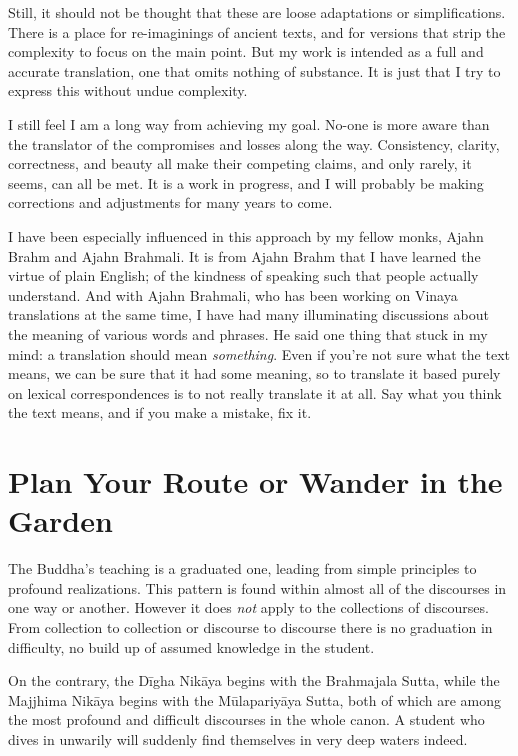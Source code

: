 \documentclass[12pt,openany]{book}%
\begin{document}
Still, it should not be thought that these are loose adaptations or simplifications. There is a place for re-imaginings of ancient texts, and for versions that strip the complexity to focus on the main point. But my work is intended as a full and accurate translation, one that omits nothing of substance. It is just that I try to express this without undue complexity.

I still feel I am a long way from achieving my goal. No-one is more aware than the translator of the compromises and losses along the way. Consistency, clarity, correctness, and beauty all make their competing claims, and only rarely, it seems, can all be met. It is a work in progress, and I will probably be making corrections and adjustments for many years to come.

I have been especially influenced in this approach by my fellow monks, Ajahn Brahm and Ajahn Brahmali. It is from Ajahn Brahm that I have learned the virtue of plain English; of the kindness of speaking such that people actually understand. And with Ajahn Brahmali, who has been working on Vinaya translations at the same time, I have had many illuminating discussions about the meaning of various words and phrases. He said one thing that stuck in my mind: a translation should mean \emph{something}. Even if you’re not sure what the text means, we can be sure that it had some meaning, so to translate it based purely on lexical correspondences is to not really translate it at all. Say what you think the text means, and if you make a mistake, fix it.

\section*{Plan Your Route or Wander in the Garden}

The Buddha’s teaching is a graduated one, leading from simple principles to profound realizations. This pattern is found within almost all of the discourses in one way or another. However it does \emph{not} apply to the collections of discourses. From collection to collection or discourse to discourse there is no graduation in difficulty, no build up of assumed knowledge in the student.

On the contrary, the \textsanskrit{Dīgha} \textsanskrit{Nikāya} begins with the Brahmajala Sutta, while the Majjhima \textsanskrit{Nikāya} begins with the \textsanskrit{Mūlapariyāya} Sutta, both of which are among the most profound and difficult discourses in the whole canon. A student who dives in unwarily will suddenly find themselves in very deep waters indeed.
\end{document}
